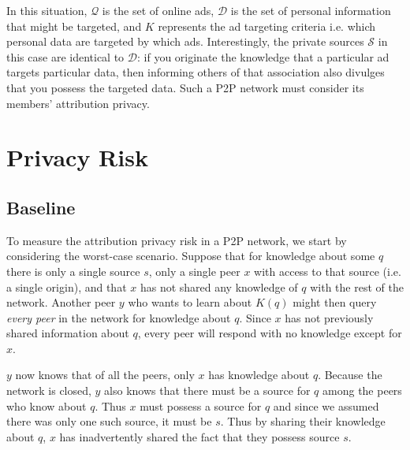 \documentclass{article}
\begin{document}
In this situation, $\mathcal{Q}$ is the set of online ads, $\mathcal{D}$ is the
set of personal information that might be targeted, and $K$ represents the ad
targeting criteria i.e. which personal data are targeted by which ads.
Interestingly, the private sources $\mathcal{S}$ in this case are identical to
$\mathcal{D}$: if you originate the knowledge that a particular ad targets
particular data, then informing others of that association also divulges that
you possess the targeted data. Such a P2P network must consider its members'
attribution privacy.

\section{Privacy Risk}\label{sec:prrsk}
\subsection{Baseline}\label{sec:baseline}

To measure the attribution privacy risk in a P2P network, we start by
considering the worst-case scenario. Suppose that for knowledge about some $q$
there is only a single source $s$, only a single peer $x$ with access to that
source (i.e. a single origin), and that $x$ has not shared any knowledge of $q$
with the rest of the network. Another peer $y$ who wants to learn about $K(q)$
might then query {\it every peer} in the network for knowledge about $q$. Since
$x$ has not previously shared information about $q$, every peer will respond
with no knowledge except for $x$.

$y$ now knows that of all the peers, only $x$ has knowledge about $q$. Because
the network is closed, $y$ also knows that there must be a source for $q$ among
the peers who know about $q$. Thus $x$ must possess a source for $q$ and since
we assumed there was only one such source, it must be $s$. Thus by sharing their
knowledge about $q$, $x$ has inadvertently shared the fact that they possess
source $s$.
\end{document}
